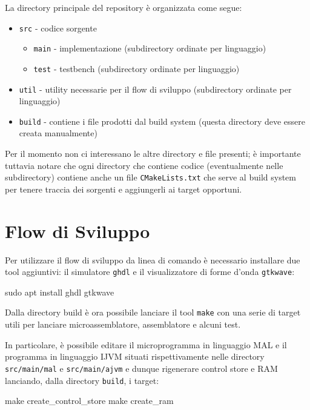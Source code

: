 \documentclass[a4paper,12pt]{scrreprt}
\begin{document}
La directory principale del repository è organizzata come segue:
\begin{itemize}
  \item \lstinline{src} - codice sorgente
  \begin{itemize}
    \item \lstinline{main} - implementazione (subdirectory ordinate per
    linguaggio)
    \item \lstinline{test} - testbench (subdirectory ordinate per linguaggio)
  \end{itemize}
  \item \lstinline{util} - utility necessarie per il flow di sviluppo
  (subdirectory ordinate per linguaggio)
  \item \lstinline{build} - contiene i file prodotti dal build system (questa
  directory deve essere creata manualmente)
\end{itemize}

Per il momento non ci interessano le altre directory e file presenti; è
importante tuttavia notare che ogni directory che contiene codice (eventualmente
nelle subdirectory) contiene anche un file \lstinline{CMakeLists.txt} che serve
al build system per tenere traccia dei sorgenti e aggiungerli ai target
opportuni.

\section{Flow di Sviluppo}

Per utilizzare il flow di sviluppo da linea di comando è necessario installare
due tool aggiuntivi: il simulatore \lstinline{ghdl} e il visualizzatore di forme
d'onda \lstinline{gtkwave}:

\begin{commandshell}
  sudo apt install ghdl gtkwave
\end{commandshell}

Dalla directory build è ora possibile lanciare il tool \lstinline{make} con una
serie di target utili per lanciare microassemblatore, assemblatore e alcuni
test.

In particolare, è possibile editare il microprogramma in linguaggio MAL e il
programma in linguaggio IJVM situati rispettivamente nelle directory
\lstinline{src/main/mal} e \lstinline{src/main/ajvm} e dunque rigenerare control
store e RAM lanciando, dalla directory \lstinline{build}, i target:

\begin{commandshell}
  make create_control_store
  make create_ram
\end{commandshell}
\end{document}
